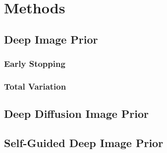 \chapter{Methods}\label{ch:methods}

\section{Deep Image Prior}

\subsection{Early Stopping}

\subsection{Total Variation}

\section{Deep Diffusion Image Prior}

\section{Self-Guided Deep Image Prior}
